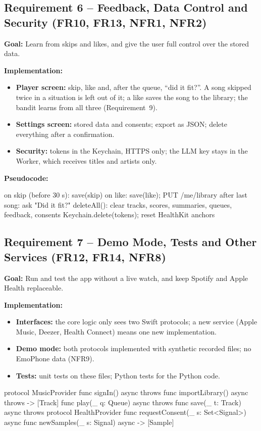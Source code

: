 \documentclass[conference]{IEEEtran}
\newcommand{\goal}[1]{\noindent\textbf{Goal:} #1\par\smallskip}
\newcommand{\impl}{\noindent\textbf{Implementation:}}
\newcommand{\pcode}{\noindent\textbf{Pseudocode:}}
\begin{document}
\subsection{Requirement 6 -- Feedback, Data Control and Security (FR10, FR13, NFR1, NFR2)}
\goal{Learn from skips and likes, and give the user full control over the stored data.}
\impl
\begin{itemize}
\item \textbf{Player screen:} skip, like and, after the queue, ``did it fit?''. A song skipped twice in a situation is left out of it; a like saves the song to the library; the bandit learns from all three (Requirement~9).
\item \textbf{Settings screen:} stored data and consents; export as JSON; delete everything after a confirmation.
\item \textbf{Security:} tokens in the Keychain, HTTPS only; the LLM key stays in the Worker, which receives titles and artists only.
\end{itemize}
\par\noindent\begin{minipage}{\columnwidth}
\pcode
\begin{code}
on skip (before 30 s): save(skip)
on like:               save(like); PUT /me/library
after last song:       ask "Did it fit?"
deleteAll():
  clear tracks, scores, summaries, queues,
        feedback, consents
  Keychain.delete(tokens); reset HealthKit anchors
\end{code}
\end{minipage}\par

\subsection{Requirement 7 -- Demo Mode, Tests and Other Services (FR12, FR14, NFR8)}\label{sec:req7}
\goal{Run and test the app without a live watch, and keep Spotify and Apple Health replaceable.}
\impl
\begin{itemize}
\item \textbf{Interfaces:} the core logic only sees two Swift protocols; a new service (Apple Music, Deezer, Health Connect) means one new implementation.
\item \textbf{Demo mode:} both protocols implemented with synthetic recorded files; no EmoPhone data (NFR9).
\item \textbf{Tests:} unit tests on these files; Python tests for the Python code.
\end{itemize}
\par\noindent\begin{minipage}{\columnwidth}
\begin{code}
protocol MusicProvider {
  func signIn() async throws
  func importLibrary() async throws -> [Track]
  func play(_ q: Queue) async throws
  func save(_ t: Track) async throws
}
protocol HealthProvider {
  func requestConsent(_ s: Set<Signal>) async
  func newSamples(_ s: Signal) async -> [Sample]
}
\end{code}
\end{minipage}\par
\end{document}
